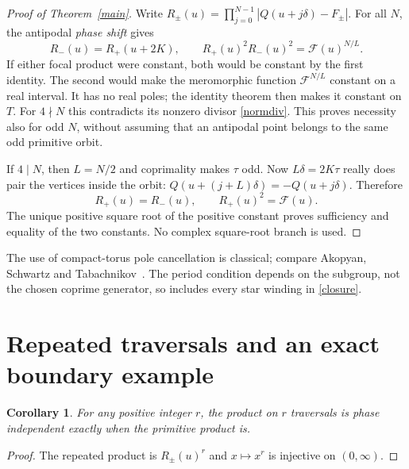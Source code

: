 \documentclass[11pt]{article}
\newtheorem{corollary}{Corollary}
\begin{document}
\begin{proof}[Proof of Theorem~\ref{main}]
Write $R_\pm(u)=\prod_{j=0}^{N-1}|Q(u+j\delta)-F_\pm|$.
For all $N$, the antipodal \emph{phase shift} gives
\begin{equation}\label{swap}
 R_-(u)=R_+(u+2K),\qquad
 R_+(u)^2R_-(u)^2=\mathcal F(u)^{N/L}.
\end{equation}
If either focal product were constant, both would be constant by the
first identity. The second would make the meromorphic function
$\mathcal F^{N/L}$ constant on a real interval. It has no real poles;
the identity theorem then makes it constant on $T$. For $4\nmid N$
this contradicts its nonzero divisor \eqref{normdiv}.
This proves necessity also for odd $N$, without assuming that an
antipodal point belongs to the same odd primitive orbit.

If $4\mid N$, then $L=N/2$ and coprimality makes $\tau$ odd.
Now $L\delta=2K\tau$ really does pair the vertices inside the orbit:
$Q(u+(j+L)\delta)=-Q(u+j\delta)$. Therefore
\[
 R_+(u)=R_-(u),\qquad R_+(u)^2=\mathcal F(u).
\]
The unique positive square root of the positive constant proves
sufficiency and equality of the two constants. No complex
square-root branch is used.
\end{proof}

The use of compact-torus pole cancellation is classical; compare
Akopyan, Schwartz and Tabachnikov~\cite{AST}. The period condition
depends on the subgroup, not the chosen coprime generator, so includes
every star winding in \eqref{closure}.

\section{Repeated traversals and an exact boundary example}\label{repeat}
\begin{corollary}
For any positive integer $r$, the product on $r$ traversals is
phase independent exactly when the primitive product is.
\end{corollary}
\begin{proof}
The repeated product is $R_\pm(u)^r$ and $x\mapsto x^r$ is injective
on $(0,\infty)$.
\end{proof}
\end{document}
